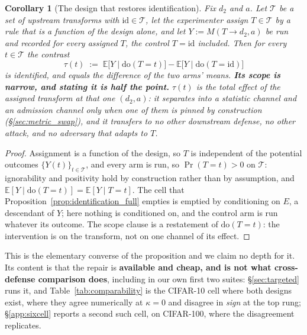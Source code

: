 \documentclass{article}
\newtheorem{corollary}{Corollary}
\begin{document}
\begin{corollary}[The design that restores identification]
\label{cor:within_design}
Fix $d_2$ and $a$. Let $\mathcal{T}$ be a set of upstream transforms with $\mathrm{id} \in \mathcal{T}$, let the experimenter assign $T \in \mathcal{T}$ by a rule that is a function of the design alone, and let $Y := M(T \to d_2, a)$ be run and recorded for every assigned $T$, the control $T{=}\mathrm{id}$ included. Then for every $t \in \mathcal{T}$ the contrast
\[
\tau(t) \;:=\; \mathbb{E}\big[Y \mid \mathrm{do}(T{=}t)\big] - \mathbb{E}\big[Y \mid \mathrm{do}(T{=}\mathrm{id})\big]
\]
is identified, and equals the difference of the two arms' means. \textbf{Its scope is narrow, and stating it is half the point.} $\tau(t)$ is the total effect of the assigned transform at that one $(d_2,a)$: it separates into a statistic channel and an admission channel only when one of them is pinned by construction (§\ref{sec:metric_swap}), and it transfers to no other downstream defense, no other attack, and no adversary that adapts to $T$.
\end{corollary}
\begin{proof}
Assignment is a function of the design, so $T$ is independent of the potential outcomes $\{Y(t)\}_{t \in \mathcal{T}}$, and every arm is run, so $\Pr(T{=}t) > 0$ on $\mathcal{T}$: ignorability and positivity hold by construction rather than by assumption, and $\mathbb{E}[Y \mid \mathrm{do}(T{=}t)] = \mathbb{E}[Y \mid T{=}t]$. The cell that Proposition~\ref{prop:identification_full} empties is emptied by conditioning on $E$, a descendant of $Y$; here nothing is conditioned on, and the control arm is run whatever its outcome. The scope clause is a restatement of $\mathrm{do}(T{=}t)$: the intervention is on the transform, not on one channel of its effect.
\end{proof}

\noindent This is the elementary converse of the proposition and we claim no depth for it. Its content is that the repair is \textbf{available and cheap, and is not what cross-defense comparison does}, including in our own first two suites: §\ref{sec:targeted} runs it, and Table~\ref{tab:comparability} is the CIFAR-10 cell where both designs exist, where they agree numerically at $\kappa{=}0$ and disagree in \emph{sign} at the top rung; §\ref{app:sixcell} reports a second such cell, on CIFAR-100, where the disagreement replicates.
\end{document}

